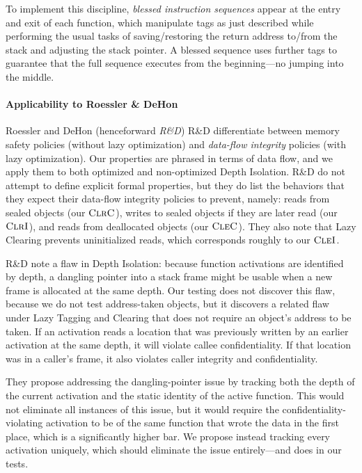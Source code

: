 \documentclass[10pt,conference]{ieeetran}%
\theoremstyle{definition}
\begin{document}
To implement this discipline, {\em blessed instruction sequences} appear at
the entry and exit of each function, which manipulate tags as just described
while performing the usual tasks of saving/restoring the return address to/from
the stack and adjusting the stack pointer. A blessed sequence uses further tags
to guarantee that the full sequence executes from the beginning---no jumping into the middle.

\paragraph*{Applicability to Roessler \& DeHon~\cite{DBLP:conf/sp/RoesslerD18}}

Roessler and DeHon (henceforward \emph{R\&D})
R\&D differentiate between memory safety policies (without lazy optimization)
and {\em data-flow integrity} policies (with lazy optimization). Our properties
are phrased in terms of data flow, and we apply them to both optimized and non-optimized
Depth Isolation.
R\&D do not attempt to define explicit formal properties, but they do list the
behaviors that they expect their data-flow integrity policies to prevent, namely:
reads from sealed objects
(our \(\textnormal{\sc ClrC}\)), writes to sealed objects
if they are later read (our \(\textnormal{\sc ClrI}\)), and reads
from deallocated objects (our \(\textnormal{\sc CleC}\)).
They also note that Lazy Clearing prevents uninitialized reads,
which corresponds roughly to our \(\textnormal{\sc CleI}\).

R\&D note a flaw in Depth Isolation: because function activations
are identified by depth, a dangling pointer into a stack frame might be usable
when a new frame is allocated at the same depth. Our testing does not discover
this flaw, because we do not test address-taken objects, but it discovers a
related flaw under Lazy Tagging and Clearing that does not require
an object's address to be taken. If an activation reads a location
that was previously written by an earlier activation at the same depth, it will
violate callee confidentiality. If that location was in a caller's frame,
it also violates caller integrity and confidentiality.

They propose addressing the dangling-pointer issue by
tracking both the depth of the current activation and the static identity
of the active function. This would not eliminate all instances of this issue, but it
would require the confidentiality-violating activation to be of the same
function that wrote the data in the first place, which is a significantly higher bar.
We propose instead tracking every activation uniquely, which should eliminate the
issue entirely---and does in our tests.
\end{document}
